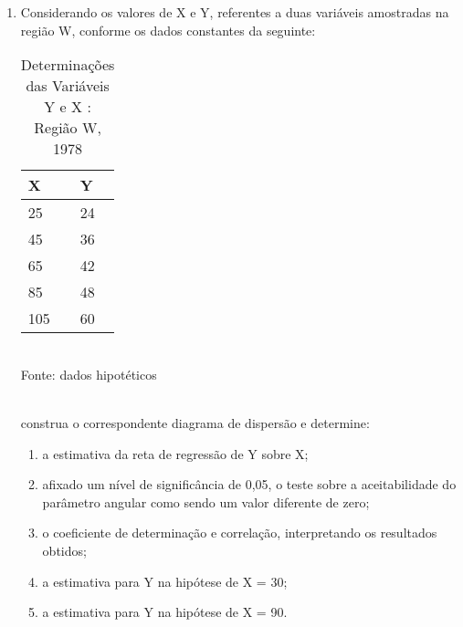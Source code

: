 \begin{enumerate}[resume]
\item Considerando os valores de X e Y, referentes a duas variáveis amostradas na região W, conforme os dados constantes da seguinte:
	\begin{table}[!htb]
	\centering
	\caption{Determinações das Variáveis Y e X : Região W, 1978}
	\vspace{0.5cm}
	\begin{tabular}{ll}
	X & Y \\
	\hline 
	25 & 24  \\
	45 & 36  \\
	65 & 42 \\
	85 & 48  \\
	105 & 60  \\
	\end{tabular}\\
	Fonte: dados hipotéticos\\
	\end{table}\\	
	construa o correspondente diagrama de dispersão e determine:
	\begin{enumerate}
	\item a estimativa da reta de regressão de Y sobre X;
	\item afixado um nível de significância de 0,05, o teste sobre a aceitabilidade do parâmetro angular como sendo um valor diferente de zero;
	\item o coeficiente de determinação e correlação, interpretando os resultados obtidos;
	\item	a estimativa para Y na hipótese de X = 30;
	\item	a estimativa para Y na hipótese de X = 90.
	\end{enumerate}
	
\end{enumerate}